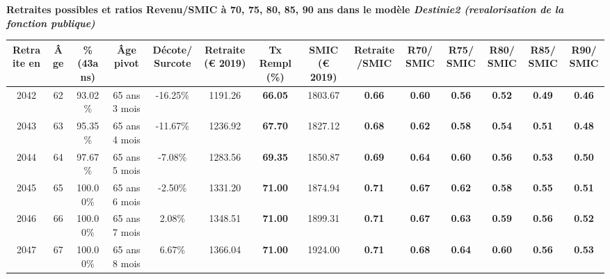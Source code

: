  \vspace{0.1cm} 
{\bf \noindent Retraites possibles et ratios Revenu/SMIC à 70, 75, 80, 85, 90 ans dans le modèle \emph{Destinie2 (revalorisation de la fonction publique)}}  
 
\begin{adjustbox}{max width=\textwidth} 
\begin{tabular}[htb]{|c|c||c|c|c||c|c||c|c||c|c|c|c|c|} 
\hline 
 Retraite en &  Âge &  \%(43ans) &  Âge pivot &  Décote/Surcote &  Retraite (\euro{} 2019) &  Tx Rempl(\%) &  SMIC (\euro{} 2019) &  Retraite/SMIC &  R70/SMIC &  R75/SMIC &  R80/SMIC &  R85/SMIC &  R90/SMIC \\ 
\hline \hline 
 2042 &  62 &  93.02\% &  65 ans 3 mois &  -16.25\% &  1191.26 &  {\bf 66.05} &  1803.67 &  {\bf {\color{red} 0.66}} &  {\bf {\color{red} 0.60}} &  {\bf {\color{red} 0.56}} &  {\bf {\color{red} 0.52}} &  {\bf {\color{red} 0.49}} &  {\bf {\color{red} 0.46}} \\ 
\hline 
 2043 &  63 &  95.35\% &  65 ans 4 mois &  -11.67\% &  1236.92 &  {\bf 67.70} &  1827.12 &  {\bf {\color{red} 0.68}} &  {\bf {\color{red} 0.62}} &  {\bf {\color{red} 0.58}} &  {\bf {\color{red} 0.54}} &  {\bf {\color{red} 0.51}} &  {\bf {\color{red} 0.48}} \\ 
\hline 
 2044 &  64 &  97.67\% &  65 ans 5 mois &  -7.08\% &  1283.56 &  {\bf 69.35} &  1850.87 &  {\bf {\color{red} 0.69}} &  {\bf {\color{red} 0.64}} &  {\bf {\color{red} 0.60}} &  {\bf {\color{red} 0.56}} &  {\bf {\color{red} 0.53}} &  {\bf {\color{red} 0.50}} \\ 
\hline 
 2045 &  65 &  100.00\% &  65 ans 6 mois &  -2.50\% &  1331.20 &  {\bf 71.00} &  1874.94 &  {\bf {\color{red} 0.71}} &  {\bf {\color{red} 0.67}} &  {\bf {\color{red} 0.62}} &  {\bf {\color{red} 0.58}} &  {\bf {\color{red} 0.55}} &  {\bf {\color{red} 0.51}} \\ 
\hline 
 2046 &  66 &  100.00\% &  65 ans 7 mois &  2.08\% &  1348.51 &  {\bf 71.00} &  1899.31 &  {\bf {\color{red} 0.71}} &  {\bf {\color{red} 0.67}} &  {\bf {\color{red} 0.63}} &  {\bf {\color{red} 0.59}} &  {\bf {\color{red} 0.56}} &  {\bf {\color{red} 0.52}} \\ 
\hline 
 2047 &  67 &  100.00\% &  65 ans 8 mois &  6.67\% &  1366.04 &  {\bf 71.00} &  1924.00 &  {\bf {\color{red} 0.71}} &  {\bf {\color{red} 0.68}} &  {\bf {\color{red} 0.64}} &  {\bf {\color{red} 0.60}} &  {\bf {\color{red} 0.56}} &  {\bf {\color{red} 0.53}} \\ 
\hline 
\hline 
\end{tabular} 
\end{adjustbox} 
 
